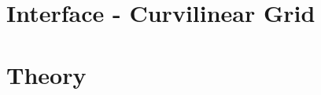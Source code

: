 \documentclass[12pt]{report}
\begin{document}












\chapter{Interface - Curvilinear Grid}





















\chapter{Theory}





\end{document}
